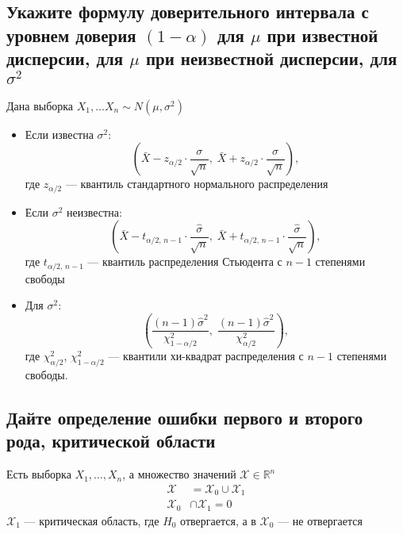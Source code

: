 \documentclass{article}
\begin{document}
\subsection{Укажите формулу доверительного интервала с уровнем доверия $(1-\alpha)$ для $\mu$ при известной дисперсии, для $\mu$ при неизвестной дисперсии, для $\sigma^{2}$}
Дана выборка $X_{1}, \ldots X_{n} \sim N\left(\mu, \sigma^{2}\right)$
\begin{itemize}
    \item Если известна $\sigma^{2}$:
    \begin{equation*}
        \left( \bar{X} - z_{\alpha/2} \cdot \frac{\sigma}{\sqrt{n}},\; \bar{X} + z_{\alpha/2} \cdot \frac{\sigma}{\sqrt{n}} \right),
    \end{equation*}
    где $z_{\alpha/2}$ — квантиль стандартного нормального распределения
    \item Если $\sigma^2$ неизвестна:
    \begin{equation*}
        \left( \bar{X} - t_{\alpha/2,\,n-1} \cdot \frac{\hat{\sigma}}{\sqrt{n}},\; \bar{X} + t_{\alpha/2,\,n-1} \cdot \frac{\hat{\sigma}}{\sqrt{n}} \right),
    \end{equation*}
    где $t_{\alpha/2,\,n-1}$ — квантиль распределения Стьюдента с $n - 1$ степенями свободы
    \item Для $\sigma^2$:
    \begin{equation*}
        \left( \frac{(n - 1)\hat{\sigma}^2}{\chi^2_{1 - \alpha/2}},\; \frac{(n - 1)\hat{\sigma}^2}{\chi^2_{\alpha/2}} \right),
    \end{equation*}
    где $\chi^2_{\alpha/2}$, $\chi^2_{1 - \alpha/2}$ — квантили хи-квадрат распределения с $n - 1$ степенями свободы.
\end{itemize}

\subsection{Дайте определение ошибки первого и второго рода, критической области}
 Есть выборка $X_1,\ldots,X_n$, а множество значений $\mathcal{X}\in\mathbb{R}^n$
\begin{equation*}
    \begin{aligned}
        \mathcal{X}&=\mathcal{X}_0\cup\mathcal{X}_1\\
        \mathcal{X}_0&\cap\mathcal{X}_1=0
    \end{aligned}
\end{equation*}
$\mathcal{X}_1$ — критическая область, где $H_0$ отвергается, а в $\mathcal{X}_0$ — не отвергается
\end{document}
